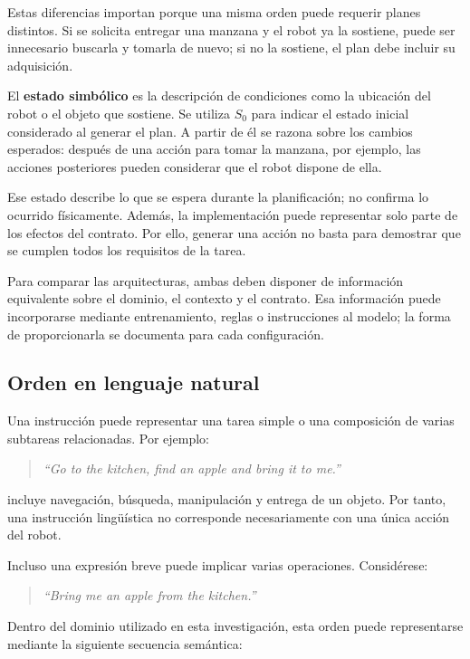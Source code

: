 Estas diferencias importan porque una misma orden puede requerir planes distintos. Si se solicita entregar una manzana y el robot ya la sostiene, puede ser innecesario buscarla y tomarla de nuevo; si no la sostiene, el plan debe incluir su adquisición.

El \textbf{estado simbólico} es la descripción de condiciones como la ubicación del robot o el objeto que sostiene. Se utiliza $S_0$ para indicar el estado inicial considerado al generar el plan. A partir de él se razona sobre los cambios esperados: después de una acción para tomar la manzana, por ejemplo, las acciones posteriores pueden considerar que el robot dispone de ella.

Ese estado describe lo que se espera durante la planificación; no confirma lo ocurrido físicamente. Además, la implementación puede representar solo parte de los efectos del contrato. Por ello, generar una acción no basta para demostrar que se cumplen todos los requisitos de la tarea.

Para comparar las arquitecturas, ambas deben disponer de información equivalente sobre el dominio, el contexto y el contrato. Esa información puede incorporarse mediante entrenamiento, reglas o instrucciones al modelo; la forma de proporcionarla se documenta para cada configuración.


\subsection{Orden en lenguaje natural}
\label{subsec:orden_natural}

Una instrucción puede representar una tarea simple o una composición de varias
subtareas relacionadas. Por ejemplo:

\begin{quote}
\textit{``Go to the kitchen, find an apple and bring it to me.''}
\end{quote}

incluye navegación, búsqueda, manipulación y entrega de un objeto. Por tanto,
una instrucción lingüística no corresponde necesariamente con una única acción
del robot.

Incluso una expresión breve puede implicar varias operaciones. Considérese:

\begin{quote}
\textit{``Bring me an apple from the kitchen.''}
\end{quote}

Dentro del dominio utilizado en esta investigación, esta orden puede
representarse mediante la siguiente secuencia semántica:

